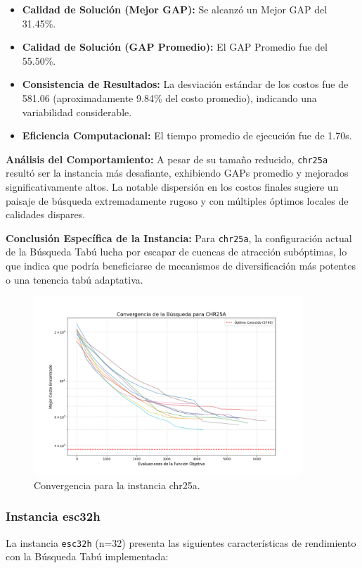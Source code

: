 \documentclass[12pt, a4paper]{article}
\begin{document}
\begin{itemize}
    \item \textbf{Calidad de Solución (Mejor GAP):} Se alcanzó un Mejor GAP del 31.45\%.
    \item \textbf{Calidad de Solución (GAP Promedio):} El GAP Promedio fue del 55.50\%.
    \item \textbf{Consistencia de Resultados:} La desviación estándar de los costos fue de 581.06 (aproximadamente 9.84\% del costo promedio), indicando una variabilidad considerable.
    \item \textbf{Eficiencia Computacional:} El tiempo promedio de ejecución fue de 1.70s.
\end{itemize}

\textbf{Análisis del Comportamiento:}
A pesar de su tamaño reducido, \texttt{chr25a} resultó ser la instancia más desafiante, exhibiendo GAPs promedio y mejorados significativamente altos. La notable dispersión en los costos finales sugiere un paisaje de búsqueda extremadamente rugoso y con múltiples óptimos locales de calidades dispares.

\textbf{Conclusión Específica de la Instancia:}
Para \texttt{chr25a}, la configuración actual de la Búsqueda Tabú lucha por escapar de cuencas de atracción subóptimas, lo que indica que podría beneficiarse de mecanismos de diversificación más potentes o una tenencia tabú adaptativa.
\begin{figure}[H]
\centering
\includegraphics[width=0.9\textwidth]{../results/graphs/chr25a_convergence.png}
\caption{Convergencia para la instancia chr25a.}
\label{fig:chr25a_conv}
\end{figure}

\newpage
\subsubsection{Instancia esc32h}
La instancia \texttt{esc32h} (n=32) presenta las siguientes características de rendimiento con la Búsqueda Tabú implementada:
\end{document}
